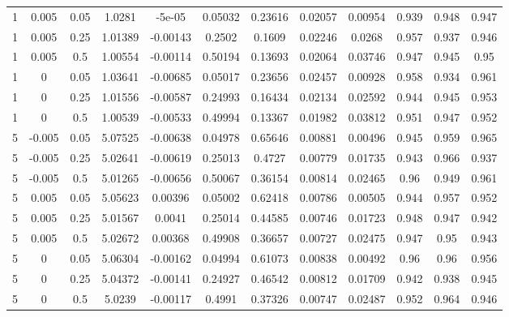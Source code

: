 \documentclass{article}
\begin{document}
\begin{table}[htb]
\begin{tabular}{cccccccccccc}
1	&0.005	&0.05	&1.0281	        &-5e-05	        &0.05032	&0.23616	&0.02057	&0.00954	&0.939	&0.948	&0.947\\
1	&0.005	&0.25	&1.01389	&-0.00143	&0.2502	&0.1609	&0.02246	&0.0268	&0.957	&0.937	&0.946\\
1	&0.005	&0.5	&1.00554	&-0.00114	&0.50194	&0.13693	&0.02064	&0.03746	&0.947	&0.945	&0.95\\
1	&0	&0.05	&1.03641	&-0.00685	&0.05017	&0.23656	&0.02457	&0.00928	&0.958	&0.934	&0.961\\
1	&0	&0.25	&1.01556	&-0.00587	&0.24993	&0.16434	&0.02134	&0.02592	&0.944	&0.945	&0.953\\
1	&0	&0.5	&1.00539	&-0.00533	&0.49994	&0.13367	&0.01982	&0.03812	&0.951	&0.947	&0.952\\
5	&-0.005	&0.05	&5.07525	&-0.00638	&0.04978	&0.65646	&0.00881	&0.00496	&0.945	&0.959	&0.965\\
5	&-0.005	&0.25	&5.02641	&-0.00619	&0.25013	&0.4727	&0.00779	&0.01735	&0.943	&0.966	&0.937\\
5	&-0.005	&0.5	&5.01265	&-0.00656	&0.50067	&0.36154	&0.00814	&0.02465	&0.96	&0.949	&0.961\\
5	&0.005	&0.05	&5.05623	&0.00396	&0.05002	&0.62418	&0.00786	&0.00505	&0.944	&0.957	&0.952\\
5	&0.005	&0.25	&5.01567	&0.0041	&0.25014	&0.44585	&0.00746	&0.01723	&0.948	&0.947	&0.942\\
5	&0.005	&0.5	&5.02672	&0.00368	&0.49908	&0.36657	&0.00727	&0.02475	&0.947	&0.95	&0.943\\
5	&0	&0.05	&5.06304	&-0.00162	&0.04994	&0.61073	&0.00838	&0.00492	&0.96	&0.96	&0.956\\
5	&0	&0.25	&5.04372	&-0.00141	&0.24927	&0.46542	&0.00812	&0.01709	&0.942	&0.938	&0.945\\
5	&0	&0.5	&5.0239	&-0.00117	&0.4991	&0.37326	&0.00747	&0.02487	&0.952	&0.964	&0.946\\
  \hline
  \end{tabular}
  \label{tab:simexp}
\end{table}
\clearpage
\end{document}
